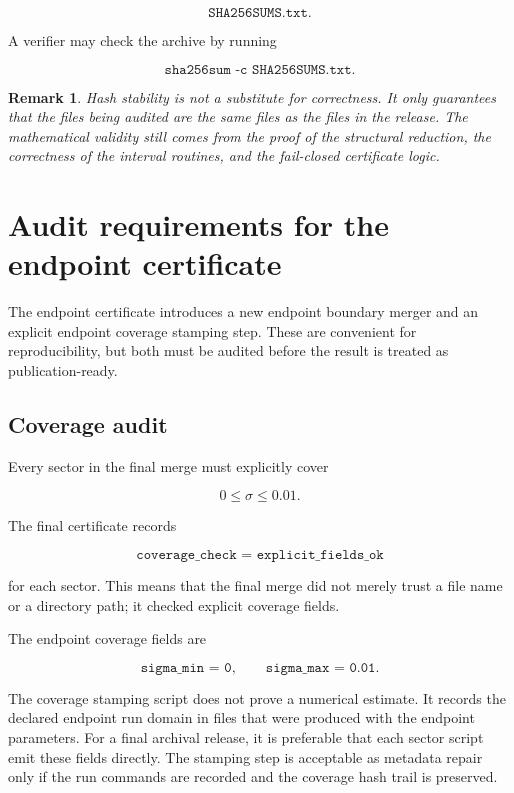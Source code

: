 \documentclass[11pt]{article}
\newtheorem{remark}[theorem]{Remark}
\begin{document}
\[
\texttt{SHA256SUMS.txt}.
\]

A verifier may check the archive by running

\[
\texttt{sha256sum -c SHA256SUMS.txt}.
\]

\begin{remark}
Hash stability is not a substitute for correctness.  It only guarantees that the files being audited are the same files as the files in the release.  The mathematical validity still comes from the proof of the structural reduction, the correctness of the interval routines, and the fail-closed certificate logic.
\end{remark}

\section{Audit requirements for the endpoint certificate}

The endpoint certificate introduces a new endpoint boundary merger and an explicit endpoint coverage stamping step.  These are convenient for reproducibility, but both must be audited before the result is treated as publication-ready.

\subsection{Coverage audit}

Every sector in the final merge must explicitly cover

\[
0\leq \sigma\leq0.01.
\]

The final certificate records

\[
\texttt{coverage\_check = explicit\_fields\_ok}
\]

for each sector.  This means that the final merge did not merely trust a file name or a directory path; it checked explicit coverage fields.

The endpoint coverage fields are

\[
\texttt{sigma\_min = 0},
\qquad
\texttt{sigma\_max = 0.01}.
\]

The coverage stamping script does not prove a numerical estimate.  It records the declared endpoint run domain in files that were produced with the endpoint parameters.  For a final archival release, it is preferable that each sector script emit these fields directly.  The stamping step is acceptable as metadata repair only if the run commands are recorded and the coverage hash trail is preserved.
\end{document}
